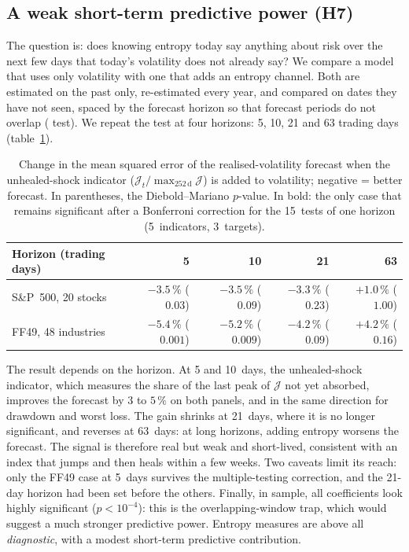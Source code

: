 \documentclass[11pt]{article}
\theoremstyle{definition}
\newcommand{\JJ}{\mathcal{J}}
\begin{document}
\subsection{A weak short-term predictive power (H7)}

The question is: does knowing entropy today say anything about risk over the
next few days that today's volatility does not already say? We compare a model
that uses only volatility with one that adds an entropy channel. Both are
estimated on the past only, re-estimated every year, and compared on dates
they have not seen, spaced by the forecast horizon so that forecast periods do
not overlap (\citealp{dm1995} test). We repeat the test at four horizons: 5,
10, 21 and 63 trading days (table~\ref{tab:h7}).

\begin{table}[htbp]
\centering
\small
\begin{tabular}{@{}lrrrr@{}}
\toprule
Horizon (trading days) & 5 & 10 & 21 & 63 \\
\midrule
S\&P~500, 20 stocks & $-3.5\,\%$ ($0.03$) & $-3.5\,\%$ ($0.09$) & $-3.3\,\%$ ($0.23$) & $+1.0\,\%$ ($1.00$) \\
FF49, 48 industries & $\mathbf{-5.4\,\%}$ ($\mathbf{0.001}$) & $-5.2\,\%$ ($0.009$) & $-4.2\,\%$ ($0.09$) & $+4.2\,\%$ ($0.16$) \\
\bottomrule
\end{tabular}
\caption{Change in the mean squared error of the realised-volatility forecast
when the unhealed-shock indicator ($\JJ_t/\max_{252\,\text{d}}\JJ$) is added
to volatility; negative = better forecast. In parentheses, the
Diebold--Mariano $p$-value. In bold: the only case that remains significant
after a Bonferroni correction for the 15~tests of one horizon (5~indicators,
3~targets).}
\label{tab:h7}
\end{table}

The result depends on the horizon. At 5 and 10~days, the unhealed-shock
indicator, which measures the share of the last peak of $\JJ$ not yet
absorbed, improves the forecast by $3$ to $5\,\%$ on both panels, and in the
same direction for drawdown and worst loss. The gain shrinks at 21~days, where
it is no longer significant, and reverses at 63~days: at long horizons, adding
entropy worsens the forecast. The signal is therefore real but weak and
short-lived, consistent with an index that jumps and then heals within a few
weeks. Two caveats limit its reach: only the FF49 case at 5~days survives the
multiple-testing correction, and the 21-day horizon had been set before the
others. Finally, in sample, all coefficients look highly significant
($p<10^{-4}$): this is the overlapping-window trap, which would suggest a much
stronger predictive power. Entropy measures are above all
\emph{diagnostic}, with a modest short-term predictive contribution.
\end{document}
